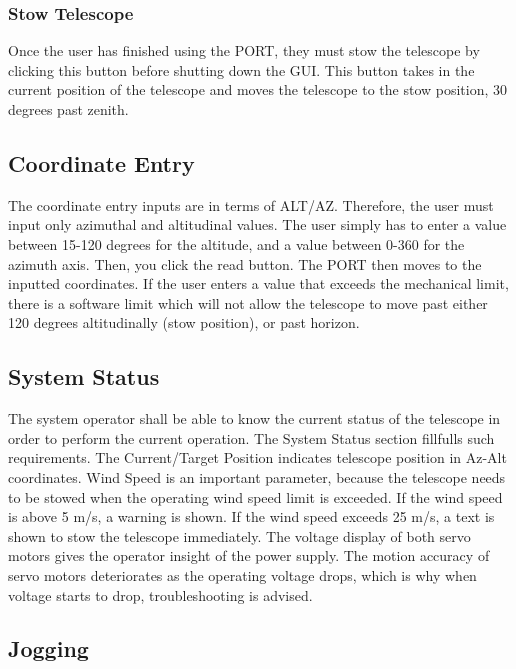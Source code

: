 \documentclass{article}
\begin{document}
\subsubsection{Stow Telescope}

Once the user has finished using the PORT, they must stow the telescope by clicking this button before shutting down the GUI. This button takes in the current position of the telescope and moves the telescope to the stow position, 30 degrees past zenith. 

\subsection{Coordinate Entry}

The coordinate entry inputs are in terms of ALT/AZ. Therefore, the user must input only azimuthal and altitudinal values. The user simply has to enter a value between 15-120 degrees for the altitude, and a value between 0-360 for the azimuth axis. Then, you click the read button. The PORT then moves to the inputted coordinates. If the user enters a value that exceeds the mechanical limit, there is a software limit which will not allow the telescope to move past either 120 degrees altitudinally (stow position), or past horizon.

\subsection{System Status}

The system operator shall be able to know the current status of the telescope in order to perform the current operation. The System Status section fillfulls such requirements. The Current/Target Position indicates telescope position in Az-Alt coordinates. Wind Speed is an important parameter, because the telescope needs to be stowed when the operating wind speed limit is exceeded. If the wind speed is above 5 m/s, a warning is shown. If the wind speed exceeds 25 m/s, a text is shown to stow the telescope immediately. The voltage display of both servo motors gives the operator insight of the power supply. The motion accuracy of servo motors deteriorates as the operating voltage drops, which is why when voltage starts to drop, troubleshooting is advised.

\subsection{Jogging}
\end{document}
